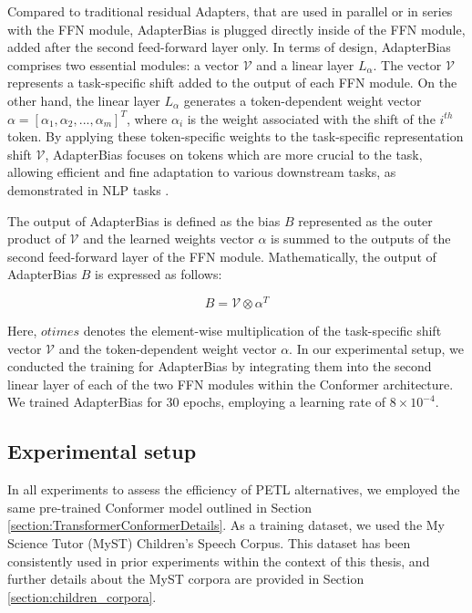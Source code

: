 Compared to traditional residual Adapters, that are used in parallel or in series with the \ac{FFN} module, AdapterBias is plugged directly inside of the \ac{FFN} module, added after the second feed-forward layer only. In terms of design, AdapterBias comprises two essential modules: a vector $\mathcal{V}$ and a linear layer $L_\alpha$. The vector $\mathcal{V}$ represents a task-specific shift added to the output of each \ac{FFN} module. On the other hand, the linear layer $L_\alpha$ generates a token-dependent weight vector $\alpha = [\alpha_1, \alpha_2, ..., \alpha_m]^T$, where $\alpha_i$ is the weight associated with the shift of the $i^{th}$ token. By applying these token-specific weights to the task-specific representation shift $\mathcal{V}$, AdapterBias focuses on tokens which are more crucial to the task, allowing efficient and fine adaptation to various downstream tasks, as demonstrated in \ac{NLP} tasks \cite{fu-etal-2022-adapterbias}.

The output of AdapterBias is defined as the bias $B$ represented as the outer product of $\mathcal{V}$ and the learned weights vector $\alpha$ is summed to the outputs of the second feed-forward layer of the \ac{FFN} module. Mathematically, the output of AdapterBias $B$ is expressed as follows:

\begin{equation}
    B = \mathcal{V} \otimes \alpha^T    
\end{equation}

Here, $otimes$ denotes the element-wise multiplication of the task-specific shift vector $\mathcal{V}$ and the token-dependent weight vector $\alpha$.
In our experimental setup, we conducted the training for AdapterBias by integrating them into the second linear layer of each of the two \ac{FFN} modules within the Conformer architecture. We trained AdapterBias for 30 epochs, employing a learning rate of $8 \times 10^{-4}$.

\subsection{Experimental setup}

In all experiments to assess the efficiency of \ac{PETL} alternatives, we employed the same pre-trained Conformer model outlined in Section \ref{section:TransformerConformerDetails}. As a training dataset, we used the My Science Tutor (MyST) Children's Speech Corpus. This dataset has been consistently used in prior experiments within the context of this thesis, and further details about the MyST corpora are provided in Section \ref{section:children_corpora}.

